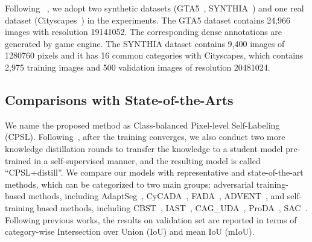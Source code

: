 \documentclass[10pt,twocolumn,letterpaper]{article}
\begin{document}
	 Following ~\cite{zhang2019category,zhang2017curriculum,mei2020instance}, we adopt two synthetic datasets (GTA5~\cite{richter2016playing}, SYNTHIA~\cite{ros2016synthia}) and one real dataset (Cityscapes~\cite{cordts2016cityscapes}) in the experiments. The GTA5 dataset contains 24,966 images with resolution 19141052. The corresponding dense annotations are generated by game engine. The SYNTHIA dataset contains 9,400 images of 1280760 pixels and it has 16 common categories with Cityscapes, which contains 2,975 training images and 500 validation images of resolution 20481024. 


	\subsection{Comparisons with State-of-the-Arts}
	\label{sec4.2}
	We name the proposed method as Class-balanced Pixel-level Self-Labeling (CPSL). Following~\cite{zhang2021prototypical}, after the training converges, we also conduct two more knowledge distillation rounds to transfer the knowledge to a student model pre-trained in a self-supervised manner, and the resulting model is called “CPSL+distill”. 
We compare our models with representative and state-of-the-art methods, which can be categorized to two main groups: adversarial training-based methods, including AdaptSeg~\cite{tsai2018learning}, CyCADA~\cite{hoffman2017cycada}, FADA~\cite{wang2020classes}, ADVENT~\cite{vu2019advent}, and self-training based methods, including CBST~\cite{zou2018domain}, IAST~\cite{mei2020instance}, CAG\_UDA~\cite{zhang2019category}, ProDA~\cite{zhang2021prototypical}, SAC~\cite{araslanov2021self}. Following previous works, the results on validation set are reported in terms of category-wise Intersection over Union (IoU) and mean IoU (mIoU).
	
\end{document}
